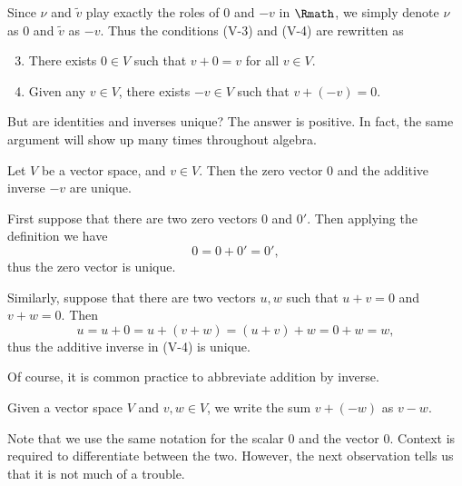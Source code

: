 Since \(\nu\) and \(\tilde v\) play exactly the roles of
\(0\) and \(-v\) in \(\Rmath\),
we simply denote \(\nu\) as \(0\) and \(\tilde v\) as \(-v\).
Thus the conditions (V-3) and (V-4) are rewritten as
\begin{enumerate}[label=(V-\arabic*)]
    \setcounter{enumi}{2}
    \item There exists \(0\in V\) such that
    \(v+0=v\) for all \(v\in V\).

    \item Given any \(v\in V\),
    there exists \(-v\in V\) such that \(v+(-v)=0\).
\end{enumerate}

But are identities and inverses unique?
The answer is positive.
In fact, the same argument will show up many times throughout algebra.

\begin{proposition}
    \label{prop:vsidinvuniq}
    Let \(V\) be a vector space,
    and \(v\in V\).
    Then the zero vector \(0\)
    and the additive inverse \(-v\) are unique.
\end{proposition}
\begin{myproof}
    First suppose that there are two zero vectors \(0\) and \(0'\).
    Then applying the definition we have
    \[
        0=0+0'=0',
    \]
    thus the zero vector is unique.

    Similarly, suppose that there are two vectors \(u,w\)
    such that \(u+v=0\) and \(v+w=0\).
    Then
    \[
        u=u+0=u+(v+w)=(u+v)+w=0+w=w,
    \]
    thus the additive inverse in (V-4) is unique.
\end{myproof}

Of course, it is common practice to abbreviate addition by inverse.

\begin{convention}
    \label{cnv:vecsubtraction}
    Given a vector space \(V\) and \(v,w\in V\),
    we write the sum \(v+(-w)\) as \(v-w\).
\end{convention}

Note that
we use the same notation for the scalar \(0\) and the vector \(0\).
Context is required to differentiate between the two.
However, the next observation tells us that
it is not much of a trouble.

